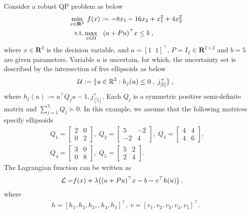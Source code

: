 \documentclass[journal,twoside,web]{ieeecolor}
\begin{document}
Consider a robust QP problem as below
\begin{align} \label{ro_simulation}
&\min_{x \in \mathbf{R}^2} \;f(x):=-8x_1-16x_2+x_1^2+4x_2^2\nonumber\\
&\;\;\;\text{s.t.} \max_{u\in {\cal U}} \;\;\; (a+Pu)^\top x\leq b\;,
\end{align}
where $x \in \mathbf{R}^2$ is the decision variable, and $a =[1\;\;1]^\top$, $P=I_2 \in \mathbf{R}^{2 \times 2}$ and $b=5$ are given parameters. Variable $u$ is uncertain, for which, the uncertainty set is described by the intersection of five ellipsoids as below
\begin{align*}{\cal U}:=\{u \in \mathbb{R}^{2}:h_{j}(u) \leq 0\;,\; j^+_{[5]}\}\;,\end{align*}
where
$h_j(u):=u^\top Q_j u-1, j^+_{[5]}$. Each $Q_{j}$ is a symmetric positive semi-definite matrix and $ \sum_{j=1}^{5} Q_j \succ 0$. In this example, we assume that the following matrices specify ellipsoids
\begin{align*}
&Q_1=\left[\begin{array}{ccl} 2 & 0\\0 & 2 \end{array}\right],\; Q_2=\left[\begin{array}{ccl} 5 & -2\\-2 & 4  \end{array}\right],\; Q_3=\left[\begin{array}{ccl} 4 & 4\\4 & 6\end{array}\right],\;\\
&Q_4=\left[\begin{array}{ccl} 3 & 0\\0 & 8 \end{array}\right],\;
Q_5=\left[\begin{array}{ccl} 5 & 2\\2 & 4 \end{array}\right].
\end{align*}
The Lagrangian function can be written as
\begin{align*}
{\cal L}=&f(x)+\lambda \big((a+Pu)^\top x-b-v ^\top h(u)\big)\;.
\end{align*}
where
\begin{align*}
h=[h_1,h_2,h_3,,h_4,h_5]^\top ,\ v=[v_1,v_2,v_3,v_4,v_5]^\top.
\end{align*}
\end{document}
